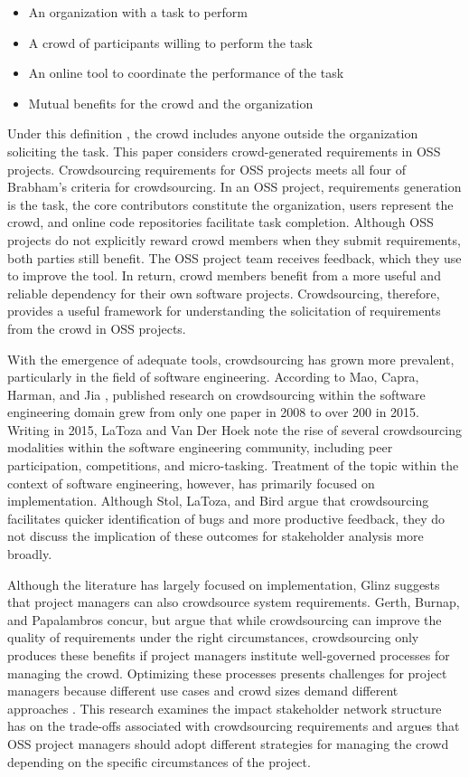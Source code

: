 \begin{itemize}
    \item An organization with a task to perform
    \item A crowd of participants willing to perform the task
    \item An online tool to coordinate the performance of the task
    \item Mutual benefits for the crowd and the organization
\end{itemize}

Under this definition \cite{brabham}, the crowd includes anyone outside the organization soliciting the task. This paper considers crowd-generated requirements in OSS projects. Crowdsourcing requirements for OSS projects meets all four of Brabham's \cite{brabham} criteria for crowdsourcing. In an OSS project, requirements generation is the task, the core contributors constitute the organization, users represent the crowd, and online code repositories facilitate task completion. Although OSS projects do not explicitly reward crowd members when they submit requirements, both parties still benefit. The OSS project team receives feedback, which they use to improve the tool. In return, crowd members benefit from a more useful and reliable dependency for their own software projects. Crowdsourcing, therefore, provides a useful framework for understanding the solicitation of requirements from the crowd in OSS projects.

With the emergence of adequate tools, crowdsourcing has grown more prevalent, particularly in the field of software engineering. According to Mao, Capra, Harman, and Jia  \cite{mao}, published research on crowdsourcing within the software engineering domain grew from only one paper in 2008 to over 200 in 2015. Writing in 2015, LaToza and Van Der Hoek  \cite{latoza} note the rise of several crowdsourcing modalities within the software engineering community, including peer participation, competitions, and micro-tasking. Treatment of the topic within the context of software engineering, however, has primarily focused on implementation. Although Stol, LaToza, and Bird \cite{stol} argue that crowdsourcing facilitates quicker identification of bugs and more productive feedback, they do not discuss the implication of these outcomes for stakeholder analysis more broadly.

Although the literature has largely focused on implementation, Glinz \cite{glinz} suggests that project managers can also crowdsource system requirements. Gerth, Burnap, and Papalambros \cite{gerth} concur, but argue that while crowdsourcing can improve the quality of requirements under the right circumstances, crowdsourcing only produces these benefits if project managers institute well-governed processes for managing the crowd. Optimizing these processes presents challenges for project managers because different use cases and crowd sizes demand different approaches \cite{gerth}. This research examines the impact stakeholder network structure has on the trade-offs associated with crowdsourcing requirements and argues that OSS project managers should adopt different strategies for managing the crowd depending on the specific circumstances of the project.

